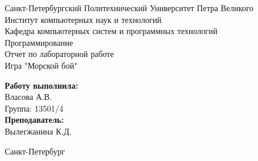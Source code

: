 \documentclass[a4paper]{article}
\begin{document}

\begin{titlepage}	%

	\begin{center}		%

		\large Санкт-Петербургский Политехнический Университет Петра Великого\\
		\large Институт компьютерных наук и технологий \\
		\large Кафедра компьютерных систем и программных технологий\\[6cm]
		
		\huge Программирование\\[0.5cm] %
		\large Отчет по лабораторной работе \\[0.1cm]
		\large Игра "Морской бой"\\[5cm]

	\end{center}


	\begin{flushright} %
		\begin{minipage}{0.25\textwidth} %
			\begin{flushleft} %

				\large\textbf{Работу выполнила:}\\
				\large Власова А.В.\\
				\large {Группа:} 13501/4\\
				
				\large \textbf{Преподаватель:}\\
				\large Вылегжанина К.Д.

			\end{flushleft}
		\end{minipage}
	\end{flushright}
	
	\vfill %

	\begin{center}
	\large Санкт-Петербург\\
	\large \the\year %
	\end{center} %

\thispagestyle{empty} %
\end{titlepage} %
\end{document}
